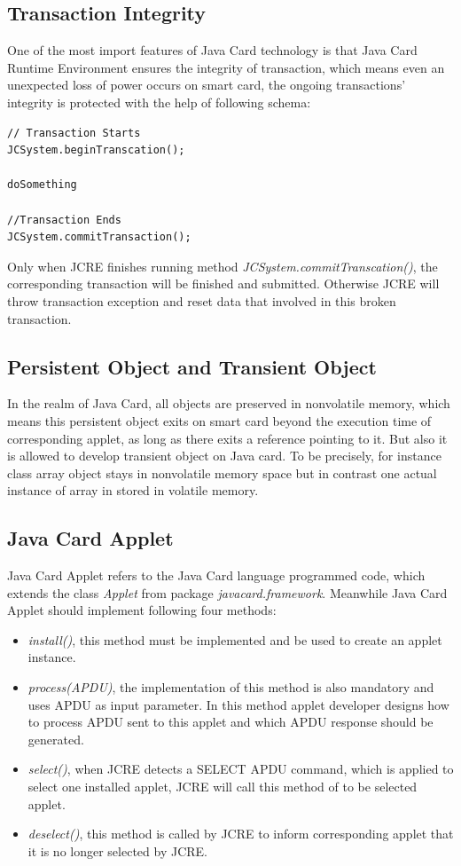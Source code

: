 \subsection{Transaction Integrity}
One of the most import features of Java Card technology is that Java Card Runtime Environment ensures the integrity of transaction, which means even an unexpected loss of power occurs on smart card, the ongoing transactions' integrity is protected with the help of following schema\cite{handbuch}:
\begin{verbatim}
// Transaction Starts
JCSystem.beginTranscation();

doSomething

//Transaction Ends
JCSystem.commitTransaction();
\end{verbatim}
Only when JCRE finishes running method \emph{JCSystem.commitTranscation()}, the corresponding transaction will be finished and submitted. Otherwise JCRE will throw transaction exception and reset data that involved in this broken transaction.

\subsection{Persistent Object and Transient Object}
In  the realm of Java Card, all objects are preserved in nonvolatile memory, which means this persistent object exits on smart card beyond the execution time of corresponding applet, as long as there exits a reference pointing to it. But also it is allowed to develop transient object on Java card. To be precisely, for instance class array object stays in nonvolatile memory space but in contrast one actual instance of array in stored in volatile memory\cite{handbuch}.

\subsection{Java Card Applet}
Java Card Applet refers to the Java Card language programmed code, which extends the class \emph{Applet} from package \emph{javacard.framework}. Meanwhile Java Card Applet should implement following four methods:
\begin{itemize}
\item\emph{install()}, this method must be implemented and be used to create an applet instance.
\item\emph{process(APDU)}, the implementation of this method is also mandatory and uses APDU as input parameter. In this method applet developer designs how to process APDU sent to this applet and which APDU response should be generated.
\item \emph{select()}, when JCRE detects a SELECT APDU command, which is applied to select one installed applet, JCRE will call this method of to be selected applet.
\item  \emph{deselect()}, this method is called by JCRE to inform corresponding applet that it is no longer selected by JCRE.
\end{itemize}

